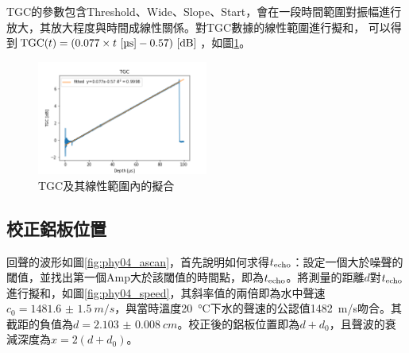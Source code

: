 \documentclass[12pt]{report}
\DeclareMathOperator{\TGC}{TGC}
\begin{document}
TGC的參數包含Threshold、Wide、Slope、Start，會在一段時間範圍對振幅進行放大，其放大程度與時間成線性關係。對TGC數據的線性範圍進行擬和，
可以得到$\TGC(t)=(0.077\times t\ [\si{\micro\second}] - 0.57) \ [{\rm dB}]$，如圖\ref{fig:phy04_tgc}。

\begin{figure}[htbp]
    \centering
    \includegraphics[width=0.5\textwidth]{PHY04_TGC.png}
    \caption{TGC及其線性範圍內的擬合}
    \label{fig:phy04_tgc}
\end{figure}

\subsection{校正鋁板位置}

回聲的波形如圖\ref{fig:phy04_ascan}，首先說明如何求得$t_{\rm echo}$：設定一個大於噪聲的閾值，並找出第一個Amp大於該閾值的時間點，即為$t_{\rm echo}$。將測量的距離$d$對$t_{\rm echo}$進行擬和，如圖\ref{fig:phy04_speed}，其斜率值的兩倍即為水中聲速$c_0=\SI{1481.6(15)}{m/s}$，與當時溫度\SI{20}{\celsius}下水的聲速的公認值\SI{1482}{m/s}吻合。其截距的負值為$d=\SI{2.103(8)}{cm}$。校正後的鋁板位置即為$d+d_0$，且聲波的衰減深度為$x=2(d+d_0)$。
\end{document}
